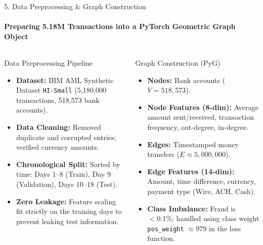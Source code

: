 \documentclass[aspectratio=169, 11pt]{beamer}
\begin{document}
\begin{frame}{5. Data Preprocessing \& Graph Construction}
    \framesubtitle{Preparing 5.18M Transactions into a PyTorch Geometric Graph Object}
    \begin{columns}[T]
        \begin{block}{Data Preprocessing Pipeline}
            \footnotesize
            \begin{itemize}\setlength{\itemsep}{2pt}
                \item \textbf{Dataset:} IBM AML Synthetic Dataset \texttt{HI-Small} (5,180,000 transactions, 518,573 bank accounts).
                \item \textbf{Data Cleaning:} Removed duplicate and corrupted entries; verified currency amounts.
                \item \textbf{Chronological Split:} Sorted by time: Days 1--8 (Train), Day 9 (Validation), Days 10--18 (Test).
                \item \textbf{Zero Leakage:} Feature scaling fit strictly on the training days to prevent leaking test information.
            \end{itemize}
        \end{block}

        \begin{block}{Graph Construction (PyG)}
            \footnotesize
            \begin{itemize}\setlength{\itemsep}{2pt}
                \item \textbf{Nodes:} Bank accounts ($V = 518,573$).
                \item \textbf{Node Features (8-dim):} Average amount sent/received, transaction frequency, out-degree, in-degree.
                \item \textbf{Edges:} Timestamped money transfers ($E \approx 5,000,000$).
                \item \textbf{Edge Features (14-dim):} Amount, time difference, currency, payment type (Wire, ACH, Cash).
                \item \textbf{Class Imbalance:} Fraud is $<0.1\%$; handled using class weight \texttt{pos\_weight} $\approx 979$ in the loss function.
            \end{itemize}
        \end{block}
    \end{columns}
\end{frame}
\end{document}
